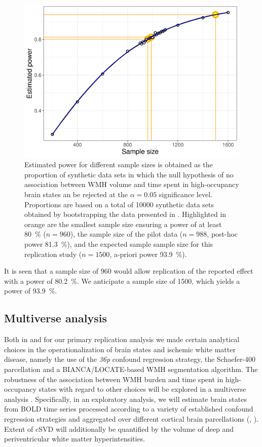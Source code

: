 \begin{figure}
    \includegraphics[width=.5\linewidth]{./../analysis/code/R/pipeline_files/figure-html/power-1.png}
    \caption{Estimated power for different sample sizes is obtained as the proportion of synthetic data sets in which the null hypothesis of no association between WMH volume and time spent in high-occupancy brain states an be rejected at the $\alpha=0.05$ significance level. Proportions are based on a total of \num{10000} synthetic data sets obtained by bootstrapping the data presented in \citep{Schlemm2022-he}. Highlighted in orange are the smallest sample size ensuring a power of at least \qty{80}{\percent} ($n=960$), the sample size of the pilot data ($n=988$, post-hoc power \qty{81.3}{\percent}), and the expected sample sample size for this replication study ($n=1500$, a-priori power \qty{93.9}{\percent}).}
    \label{fig:power}
\end{figure}

It is seen that a sample size of \num{960} would allow replication of the reported effect with a power of \qty{80.2}{\percent}.
We anticipate a sample size of \num{1500}, which yields a power of \qty{93.9}{\percent}.


\subsection{Multiverse analysis}
Both in \citep{Schlemm2022-he} and for our primary replication analysis we made certain analytical choices in the operationalization of brain states and ischemic white matter disease, namely the use of the \textit{36p} confound regression strategy, the Schaefer-\num{400} parcellation and a BIANCA/LOCATE-based WMH segmentation algorithm.
The robustness of the association between WMH burden and time spent in high-occupancy states with regard to other choices will be explored in a multiverse analysis \citep{Steegen2016-ze}. Specifically, in an exploratory analysis, we will estimate brain states from BOLD time series processed according to a variety of established confound regression strategies and aggregated over different cortical brain parcellations (, \cite{ciric2018mitigating,Ciric2017-cl}). Extent of cSVD will additionally be quantified by the volume of deep and periventricular white matter hyperintensities.

